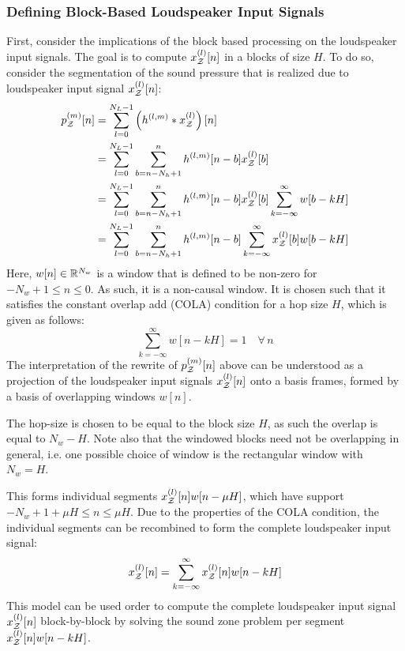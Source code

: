 \subsubsection*{Defining Block-Based Loudspeaker Input Signals}
First, consider the implications of the block based processing on the loudspeaker input signals.
The goal is to compute $x^{(l)}_{\mathcal{Z}}[n]$ in a blocks of size $H$.
To do so, consider the segmentation of the sound pressure that is realized due to loudspeaker input signal $x^{(l)}_{\mathcal{Z}}[n]$:
\begin{align}
    p_{\mathcal{Z}}^{(m)}[n] &= \sum_{l=0}^{N_L - 1} \left(h^{(l,m)} \ast x^{(l)}_{\mathcal{Z}}\right)[n] \\
               &= \sum_{l=0}^{N_L - 1} \sum_{b = n - N_h + 1}^{n} h^{(l,m)}[n - b] x^{(l)}_{\mathcal{Z}}[b] \\
               &= \sum_{l=0}^{N_L - 1} \sum_{b = n - N_h + 1}^{n} h^{(l,m)}[n - b] x^{(l)}_{\mathcal{Z}}[b] \sum_{k=-\infty}^{\infty} w[b - kH]\\
               &= \sum_{l=0}^{N_L - 1} \sum_{b = n - N_h + 1}^{n} h^{(l,m)}[n - b] \sum_{k=-\infty}^{\infty} x^{(l)}_{\mathcal{Z}}[b] w[b - kH]\\
\end{align}
Here, $w[n]\in\mathbb{R}^{N_w}$ is a window that is defined to be non-zero for $-N_w + 1 \leq n \leq 0$.
As such, it is a non-causal window.
It is chosen such that it satisfies the constant overlap add (COLA) condition for a hop size $H$, which is given as follows:
\begin{equation}
    \sum_{k=-\infty}^{\infty} w[n - kH] = 1\quad\forall\,n
\end{equation}
The interpretation of the rewrite of $p_{\mathcal{Z}}^{(m)}[n]$ above can be understood as a projection of the loudspeaker input signals $x^{(l)}_{\mathcal{Z}}[n]$ onto a basis frames,
formed by a basis of overlapping windows $w[n]$.

The hop-size is chosen to be equal to the block size $H$, as such the overlap is equal to $N_w - H$. 
Note also that the windowed blocks need not be overlapping in general, i.e. one possible choice of window is the rectangular window with $N_w = H$.

This forms individual segments $x^{(l)}_{\mathcal{Z}}[n]w[n - \mu H]$, which have support $-N_w + 1 + \mu H \leq n \leq \mu H$.
Due to the properties of the COLA condition, the individual segments can be recombined to form the complete loudspeaker input signal:
\begin{equation}
    x^{(l)}_{\mathcal{Z}}[n] = \sum_{k=-\infty}^{\infty} x^{(l)}_{\mathcal{Z}}[n] w[n - kH]
\end{equation}
This model can be used order to compute the complete loudspeaker input signal $x^{(l)}_{\mathcal{Z}}[n]$ block-by-block by solving the sound zone problem per segment $x^{(l)}_{\mathcal{Z}}[n] w[n - kH]$.

